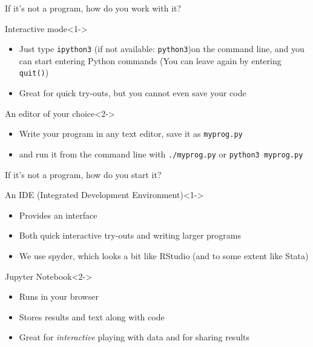 \documentclass{beamer}
\begin{document}
\begin{frame}{If it's not a program, how do you work with it?}
	\begin{block}{Interactive mode}<1->
		\begin{itemize}
			\item Just type {\tt ipython3} (if not available: {\tt python3})on the command line, and you can start entering Python commands {\tiny{(You can leave again by entering {\tt quit()})}}
			\item Great for quick try-outs, but you cannot even save your code
		\end{itemize}
	\end{block}
	
	\begin{block}{An editor of your choice}<2->
		\begin{itemize}
			\item Write your program in any text editor, save it as {\tt myprog.py}
			\item and run it from the command line with {\tt ./myprog.py} or {\tt python3 myprog.py}
		\end{itemize}
	\end{block}
\end{frame}


\begin{frame}{If it's not a program, how do you start it?}
	\begin{block}{An IDE (Integrated Development Environment)}<1->
		\begin{itemize}
			\item Provides an interface
			\item Both quick interactive try-outs and writing larger programs
			\item We use spyder, which looks a bit like RStudio (and to some extent like Stata)
		\end{itemize}
	\end{block}


\begin{block}{Jupyter Notebook}<2->
	\begin{itemize}
		\item Runs in your browser
		\item Stores results and text along with code
		\item Great for \emph{interactive} playing with data and for sharing results
	\end{itemize}
\end{block}

\end{frame}
\end{document}
